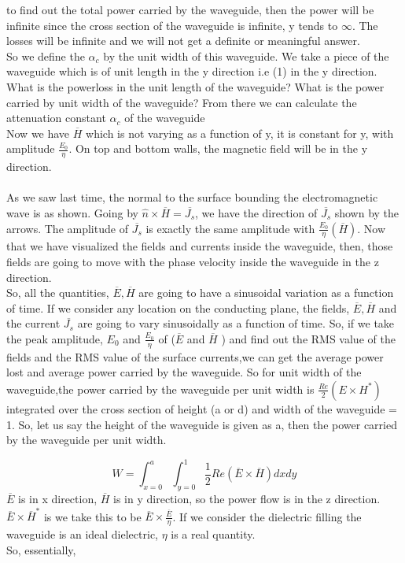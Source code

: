 to find out the total power carried by the waveguide, then the power will be infinite since the cross section of the waveguide is infinite, y tends to $\infty$. The losses will be infinite and we will not get a definite or meaningful answer.\\
So we define the $\alpha_{c}$ by the unit width of this waveguide. We take a piece of the waveguide which is of unit length in the y direction i.e (1) in the y direction. What is the powerloss in the unit length of the waveguide? What is the power carried by unit width of the waveguide? From there we can calculate the attenuation constant $\alpha_{c}$ of the waveguide\\ Now we have $\overline{H}$ which is not varying as a function of y, it is constant for y, with amplitude $\frac{E_0}{\eta}$. On top and bottom walls, the magnetic field will be in the y direction.\\\\ As we saw last time, the normal to the surface bounding the electromagnetic wave is as shown. Going by $\hat{n}\times\overline{H}=\overline{J_s}$, we have the direction of $\overline{J_s}$ shown by the arrows. The amplitude of $\overline{J_s}$ is exactly the same amplitude with $\frac{E_0}{\eta}(\overline{H})$. Now that we have visualized the fields and currents inside the waveguide, then, those fields are going to move with the phase velocity inside the waveguide in the z direction.\\
So, all the  quantities, $\overline{E}, \overline{H}$ are going to have a sinusoidal variation as a function of time. If we consider any location on the conducting plane, the fields, $\overline{E}, \overline{H}$ and the current $\overline{J_s}$ are going to vary sinusoidally as a function of time. So, if we take the peak amplitude, $E_0$ and $\frac{E_0}{\eta}$ of ($\overline{E}$ and $\overline{H}$ ) and find out the RMS value of the fields and the RMS value of the surface currents,we can get the average power lost and average power carried by the waveguide. So for unit width of the waveguide,the power carried by the waveguide per unit width is $\frac{Re}{2}(E \times H^*)$ integrated over the cross section of height (a or d) and width of the waveguide = 1. So, let us say the height of the waveguide is given as a, then the power carried by the waveguide per unit width.

\begin{equation}
W=\int_{x=0}^{a}\int_{y=0}^{1} \frac{1}{2}Re{(\overline{E} \times \overline{H})dxdy}	
\end{equation}
$\overline{E}$ is in x direction, $\overline{H}$ is in y direction, so the power flow is in the z direction. $\overline{E} \times \overline{H}^*$ is we take this to be $\overline{E} \times \frac{\overline{E}}{\eta}$. If we consider the dielectric filling the waveguide is an ideal dielectric, $\eta$ is a real quantity. \\
So, essentially,

